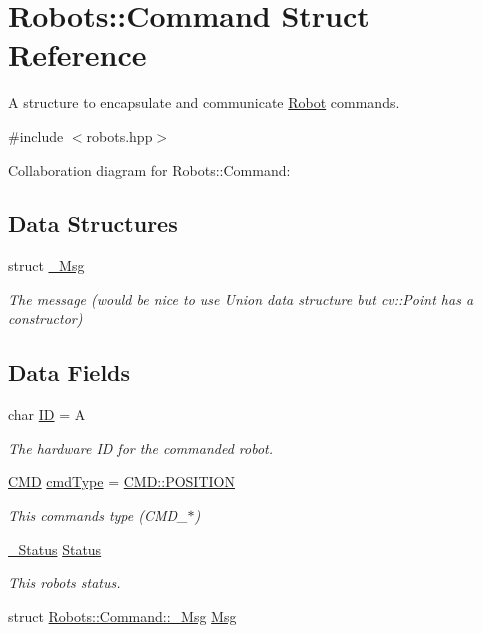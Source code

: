 \hypertarget{struct_robots_1_1_command}{}\section{Robots\+:\+:Command Struct Reference}
\label{struct_robots_1_1_command}


A structure to encapsulate and communicate \hyperlink{struct_robots_1_1_robot}{Robot} commands.  




{\ttfamily \#include $<$robots.\+hpp$>$}



Collaboration diagram for Robots\+:\+:Command\+:
\subsection*{Data Structures}
\begin{DoxyCompactItemize}
\item 
struct \hyperlink{struct_robots_1_1_command_1_1___msg}{\+\_\+\+Msg}
\begin{DoxyCompactList}\small\item\em The message (would be nice to use Union data structure but cv\+::\+Point has a constructor) \end{DoxyCompactList}\end{DoxyCompactItemize}
\subsection*{Data Fields}
\begin{DoxyCompactItemize}
\item 
char \hyperlink{struct_robots_1_1_command_a8cf119f5ac1306eb061bbc284dc9583f}{ID} = \textquotesingle{}A\textquotesingle{}
\begin{DoxyCompactList}\small\item\em The hardware ID for the commanded robot. \end{DoxyCompactList}\item 
\hyperlink{class_robots_adcc7ae7fbb9bdc57a26ee70fa1ae88e5}{C\+MD} \hyperlink{struct_robots_1_1_command_ace080efc1d95063522142dcc8d4f6482}{cmd\+Type} = \hyperlink{serial_w_8hpp_a440f0e10bb28b153f5661c934bc6b89f}{C\+M\+D\+::\+P\+O\+S\+I\+T\+I\+ON}
\begin{DoxyCompactList}\small\item\em This command\textquotesingle{}s type (C\+M\+D\+\_\+$\ast$) \end{DoxyCompactList}\item 
\hyperlink{struct_robots_1_1___status}{\+\_\+\+Status} \hyperlink{struct_robots_1_1_command_afdad6756a7987d5b8c76ea66fd681d10}{Status}
\begin{DoxyCompactList}\small\item\em This robot\textquotesingle{}s status. \end{DoxyCompactList}\item 
struct \hyperlink{struct_robots_1_1_command_1_1___msg}{Robots\+::\+Command\+::\+\_\+\+Msg} \hyperlink{struct_robots_1_1_command_a598cda1f7d4b2879d8a1435ceebbc0db}{Msg}
\end{DoxyCompactItemize}



